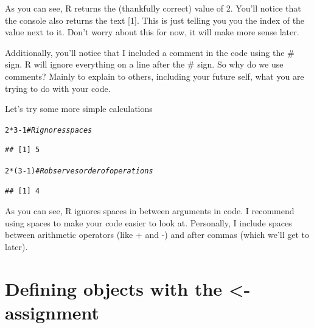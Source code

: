 \documentclass{tufte-book}\usepackage[]{graphicx}\usepackage[]{color}
\makeatletter
\newcommand{\hlnum}[1]{\textcolor[rgb]{0.686,0.059,0.569}{#1}}%
\newcommand{\hlcom}[1]{\textcolor[rgb]{0.678,0.584,0.686}{\textit{#1}}}%
\newcommand{\hlopt}[1]{\textcolor[rgb]{0,0,0}{#1}}%
\newcommand{\hlstd}[1]{\textcolor[rgb]{0.345,0.345,0.345}{#1}}%
\newenvironment{kframe}{%
 \def\at@end@of@kframe{}%
 \ifinner\ifhmode%
  \def\at@end@of@kframe{\end{minipage}}%
  \begin{minipage}{\columnwidth}%
 \fi\fi%
 \def\FrameCommand##1{\hskip\@totalleftmargin \hskip-\fboxsep
 \colorbox{shadecolor}{##1}\hskip-\fboxsep
     \hskip-\linewidth \hskip-\@totalleftmargin \hskip\columnwidth}%
 \MakeFramed {\advance\hsize-\width
   \@totalleftmargin\z@ \linewidth\hsize
   \@setminipage}}%
 {\par\unskip\endMakeFramed%
 \at@end@of@kframe}
\newenvironment{knitrout}{}{} %
\makeatother
\begin{document}
As you can see, R returns the (thankfully correct) value of 2. You'll notice that the console also returns the text [1]. This is just telling you you the index of the value next to it. Don't worry about this for now, it will make more sense later.

Additionally, you'll notice that I included a comment in the code using the \# sign. R will ignore everything on a line after the \# sign. So why do we use comments? Mainly to explain to others, including your future self, what you are trying to do with your code.

Let's try some more simple calculations


\begin{knitrout}
\color{fgcolor}\begin{kframe}
\begin{alltt}
\hlnum{2} \hlopt{*} \hlnum{3} \hlopt{-} \hlnum{1} \hlcom{# R ignores spaces}
\end{alltt}
\begin{verbatim}
## [1] 5
\end{verbatim}
\begin{alltt}
\hlnum{2} \hlopt{*} \hlstd{(}\hlnum{3} \hlopt{-} \hlnum{1}\hlstd{)} \hlcom{# R observes order of operations}
\end{alltt}
\begin{verbatim}
## [1] 4
\end{verbatim}
\end{kframe}
\end{knitrout}


As you can see, R ignores spaces in between arguments in code. I recommend using spaces to make your code easier to look at. Personally, I include spaces between arithmetic operators (like + and -) and after commas (which we'll get to later).

\section{Defining objects with the <- assignment}

\end{document}
